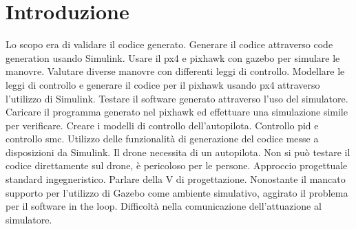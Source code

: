 \chapter{Introduzione}
\begin{idee}
	Lo scopo era di validare il codice generato.
	Generare il codice attraverso code generation usando Simulink.
	Usare il px4 e pixhawk con gazebo per simulare le manovre.
	Valutare diverse manovre con differenti leggi di controllo.
	Modellare le leggi di controllo e generare il codice per il pixhawk usando px4 attraverso l'utilizzo di Simulink.
	Testare il software generato attraverso l'uso del simulatore. Caricare il programma generato nel pixhawk ed effettuare una simulazione simile per verificare.
	Creare i modelli di controllo dell'autopilota.
	Controllo pid e controllo smc.
	Utilizzo delle funzionalità di generazione del codice messe a disposizioni da Simulink.
	Il drone necessita di un autopilota.
	Non si può testare il codice direttamente sul drone, è pericoloso per le persone.
	Approccio progettuale standard ingegneristico.
	Parlare della V di progettazione.
	Nonostante il mancato supporto per l'utilizzo di Gazebo come ambiente simulativo, aggirato il problema per il software in the loop.
	Difficoltà nella comunicazione dell'attuazione al simulatore.
\end{idee}

